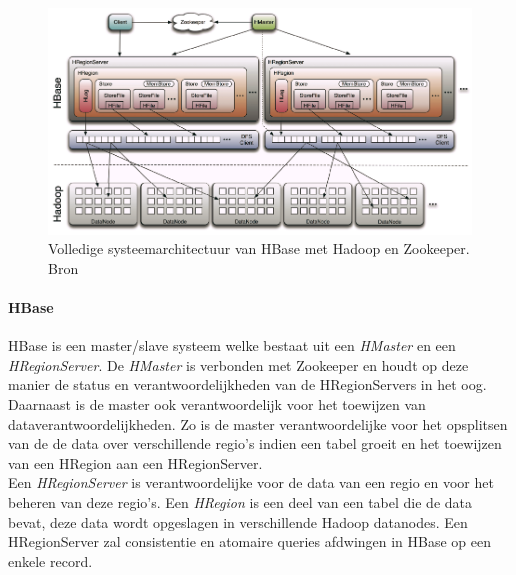 \begin{figure}[ht!]
\centering
\includegraphics[width=\linewidth]{img/Hbase-structure.png}
\caption{Volledige systeemarchitectuur van HBase met Hadoop en Zookeeper. Bron \cite{ChinHBaseComprehensive}}
\label{fig:Hbase-structure}
\end{figure}

\paragraph{HBase\cite{george2011hbase}} HBase is een master/slave systeem welke bestaat uit een \textit{HMaster} en een \textit{HRegionServer}. De \textit{HMaster} is verbonden met Zookeeper en houdt op deze manier de status en verantwoordelijkheden van de HRegionServers in het oog. Daarnaast is de master ook verantwoordelijk voor het toewijzen van dataverantwoordelijkheden. Zo is de master verantwoordelijke voor het opsplitsen van de de data over verschillende regio's indien een tabel groeit en het toewijzen van een HRegion aan een HRegionServer.\\
Een \textit{HRegionServer} is verantwoordelijke voor de data van een regio en voor het beheren van deze regio's. Een \textit{HRegion} is een deel van een tabel die de data bevat, deze data wordt opgeslagen in verschillende Hadoop datanodes. Een HRegionServer zal consistentie en atomaire queries afdwingen in HBase op een enkele record.  

